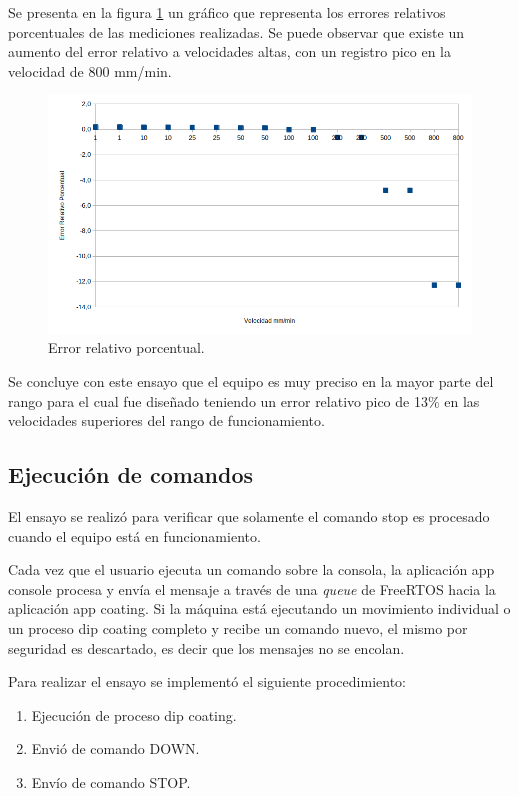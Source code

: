 Se presenta en la figura \ref{fig:error_porcentual_1} un gráfico que representa los errores relativos porcentuales de las mediciones realizadas. Se puede observar que existe un aumento del error relativo a velocidades altas, con un registro pico  en la velocidad de 800 mm/min. 


\begin{figure}[h!]
\centering 
\includegraphics[width=1\textwidth]{./Figures/error.png}
\caption{Error relativo porcentual.}
\label{fig:error_porcentual_1}
\end{figure}
Se concluye con este ensayo que el equipo es muy preciso en la mayor parte del rango para el cual fue diseñado teniendo un error relativo pico de 13\% en las velocidades superiores del rango de funcionamiento.
 
 
\subsection{Ejecución de comandos}

El ensayo se realizó para verificar que solamente el comando stop es procesado cuando el equipo está en funcionamiento. 

Cada vez que el usuario ejecuta un comando sobre la consola, la aplicación app console procesa y envía el mensaje a través de una \textit{queue} de FreeRTOS hacia la aplicación app coating. Si la máquina está ejecutando un movimiento individual o un proceso dip coating completo y recibe un comando nuevo, el mismo por seguridad es descartado, es decir que los mensajes no se encolan. 

Para realizar el ensayo se implementó el siguiente procedimiento:
\begin{enumerate}
\item Ejecución de proceso  dip coating.
\item Envió de comando DOWN.
\item Envío de comando STOP.
\end{enumerate}


